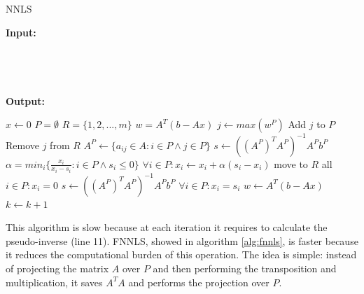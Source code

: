 \begin{algorithm}[h]
  \begin{flushleft}
  \caption{NNLS}
  \label{alg:nnls}
  \textbf{Input:} \\
  \hspace*{\algorithmicindent} \\
  \hspace*{\algorithmicindent} \\
  \hspace*{\algorithmicindent}  \\
  \hspace*{\algorithmicindent}  \\
  \textbf{Output:} \\
  \hspace*{\algorithmicindent} 
  \end{flushleft}
  \begin{algorithmic}[1]
      \State $x \gets 0$
      \State $P=\emptyset$
      \State $R=\{ 1, 2, ..., m \}$
      \State $w=A^T(b - Ax)$ 
        \State $j \gets max(w^P)$ 
        \State Add $j$ to $P$
        \State Remove $j$ from $R$
        \State $A^P \gets  \{a_{ij} \in A : i \in P \land j \in P\}$
        \State $s \gets ((A^P)^T A^P)^{-1}A^P b^P$ 
          \State $\alpha=min_i\{\frac{x_i}{x_i-s_i} : i \in P \land s_i \leq 0 \}$
          \State $ \forall i \in P : x_i \gets x_i + \alpha (s_i - x_i)$
          \State move to $R$ all $i \in P : x_i = 0$
          \State $s \gets ((A^P)^T A^P)^{-1}A^P b^P$ 
          \EndWhile
        \State $\forall i \in P : x_i = s_i$
        \State $w \gets A^T(b - Ax)$
        \State $k \gets k+1$
      \EndWhile
    \EndFunction
  \end{algorithmic}
\end{algorithm}
This algorithm is slow because at each iteration it requires to calculate the pseudo-inverse (line 11). 
FNNLS, showed in algorithm \ref{alg:fnnls}, is faster because it reduces the computational burden of this operation. The idea is simple: instead of projecting the matrix $A$ over $P$ and then performing the transposition and multiplication, it saves $A^TA$ and performs the projection over $P$. 
